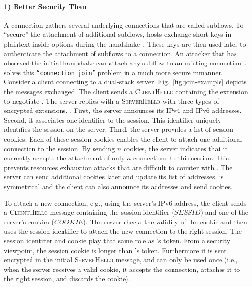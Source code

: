 \paragraph*{1) Better Security Than \mptcp} A \mptcp connection gathers several
underlying connections that are called subflows. To ``secure'' the attachment of
additional subflows, \mptcp hosts exchange short keys in plaintext inside \tcp
options during the \tcp handshake~\cite{rfc6824, rfc8684}. These keys are then
used later to authenticate the attachment of subflows to a connection. An
attacker that has observed the initial handshake can attach any subflow to an
existing \mptcp connection~\cite{rfc6181}.  \tcpls solves this
\texttt{``connection join''} problem in a much more secure mmanner. Consider a
client connecting to a dual-stack server. Fig.~\ref{fig:join-example} depicts
the \tls messages exchanged. The client sends a \textsc{ClientHello} containing
the \tcpls extension to negotiate \tcpls.  The server replies with a
\textsc{ServerHello} with three types of encrypted extensions. . First, the server announces its IPv4 and IPv6 addresses. Second, it
associates one identifier to the \tcpls session.  This identifier uniquely
identifies the \tcpls session on the server.  Third, the server provides a list
of \tcpls session cookies. Each of these session cookies enables the client to
attach one additional \tcp connection to the \tcpls session. By sending $n$
cookies, the server indicates that it currently accepts the attachment of only
$n$ \tcp connections to this session. This prevents resources exhaustion attacks
that are difficult to counter with \mptcp.  The server can
send additional cookies later and update its list of addresses. \tcpls is
symmetrical and the client can also announce its addresses and send cookies.

To attach a new connection, e.g., using the server's IPv6 address, the client
sends a \textsc{ClientHello} message containing the session identifier
($SESSID$) and one of the server's cookies ($COOKIE$). The server checks the
validity of the cookie and then uses the session identifier to attach the new
\tcp connection to the right \tcpls session. The session identifier and cookie
play that same role as \mptcp's token. From a security viewpoint, the session
cookie is longer than \mptcp's token. Furthermore it is sent encrypted in the
initial \textsc{ServerHello} message, and can only be used once (i.e., when the
server receives a valid cookie, it accepts the connection, attaches it to the
right \tcpls session, and discards the cookie).

